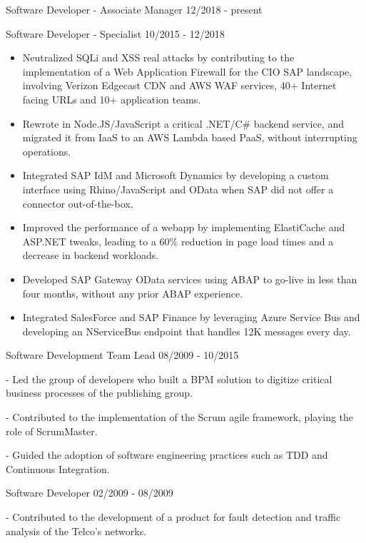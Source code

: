 \documentclass[11pt]{article} %
\begin{document}
\begin{description}
\squish
{}
           {Software Developer - Associate Manager}
           {12/2018 - present}

           {Software Developer - Specialist}
           {10/2015 - 12/2018}

\begin{itemize}
\item Neutralized SQLi and XSS real attacks by contributing to the implementation of a Web Application Firewall for the CIO SAP landscape, involving Verizon Edgecast CDN and AWS WAF services, 40+ Internet facing URLs and 10+ application teams.
\item Rewrote in Node.JS/JavaScript a critical .NET/C\# backend service, and migrated it from IaaS to an AWS Lambda based PaaS, without interrupting operations.
\item Integrated SAP IdM and Microsoft Dynamics by developing a custom interface using Rhino/JavaScript and OData when SAP did not offer a connector out-of-the-box.
\item Improved the performance of a webapp by implementing ElastiCache and ASP.NET tweaks, leading to a 60\% reduction in page load times and a decrease in backend workloads.
\item Developed SAP Gateway OData services using ABAP to go-live in less than four months, without any prior ABAP experience.
\item Integrated SalesForce and SAP Finance by leveraging Azure Service Bus and developing an NServiceBus endpoint that handles 12K messages every day.
\end{itemize}

           {Software Development Team Lead}
           {08/2009 - 10/2015}

- Led the group of developers who built a BPM solution to digitize critical business processes of the publishing group.

- Contributed to the implementation of the Scrum agile framework, playing the role of ScrumMaster.

- Guided the adoption of software engineering practices such as TDD and Continuous Integration.

           {Software Developer}
           {02/2009 - 08/2009}

- Contributed to the development of a product for fault detection and traffic analysis of the Telco's networks.

\end{description}
\end{document}
